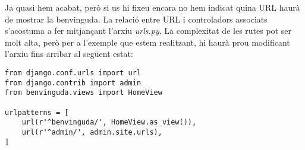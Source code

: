 \documentclass[12pt,a4paper]{article}
\begin{document}
Ja quasi hem acabat, però si us hi fixeu encara no hem indicat quina URL haurà de mostrar la benvinguda. La relació entre URL i controladors associats s'acostuma a fer mitjançant l'arxiu \emph{urls.py}. La complexitat de les rutes pot ser molt alta, però per a l'exemple que estem realitzant, hi haurà prou modificant l'arxiu fins arribar al següent estat:

\begin{lstlisting}
from django.conf.urls import url
from django.contrib import admin
from benvinguda.views import HomeView

urlpatterns = [
    url(r'^benvinguda/', HomeView.as_view()),
    url(r'^admin/', admin.site.urls),
]
\end{lstlisting}
\end{document}
